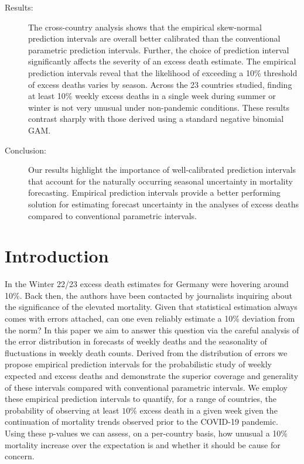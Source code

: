 \documentclass[12pt]{article}
\begin{document}
\begin{titlepage}
{\begin{description}
        \item[Results:] The cross-country analysis shows that the empirical skew-normal prediction intervals are overall better calibrated than the conventional parametric prediction intervals. Further, the choice of prediction interval significantly affects the severity of an excess death estimate. The empirical prediction intervals reveal that the likelihood of exceeding a 10\% threshold of excess deaths varies by season. Across the 23 countries studied, finding at least 10\% weekly excess deaths in a single week during summer or winter is not very unusual under non-pandemic conditions. These results contrast sharply with those derived using a standard negative binomial GAM.
        
        \item[Conclusion:] Our results highlight the importance of well-calibrated prediction intervals that account for the naturally occurring seasonal uncertainty in mortality forecasting. Empirical prediction intervals provide a better performing solution for estimating forecast uncertainty in the analyses of excess deaths compared to conventional parametric intervals.

 \end{description}
 
  \par\medskip}

\end{titlepage}


\section*{Introduction}

In the Winter 22/23 excess death estimates for Germany were hovering around 10\%. Back then, the authors have been contacted by journalists inquiring about the significance of the elevated mortality. Given that statistical estimation always comes with errors attached, can one even reliably estimate a 10\% deviation from the norm? In this paper we aim to answer this question via the careful analysis of the error distribution in forecasts of weekly deaths and the seasonality of fluctuations in weekly death counts. Derived from the distribution of errors we propose empirical prediction intervals for the probabilistic study of weekly expected and excess deaths and demonstrate the superior coverage and generality of these intervals compared with conventional parametric intervals. We employ these empirical prediction intervals to quantify, for a range of countries, the probability of observing at least $10\%$ excess death in a given week given the continuation of mortality trends observed prior to the COVID-19 pandemic. Using these p-values we can assess, on a per-country basis, how unusual a 10\% mortality increase over the expectation is and whether it should be cause for concern.
\end{document}
